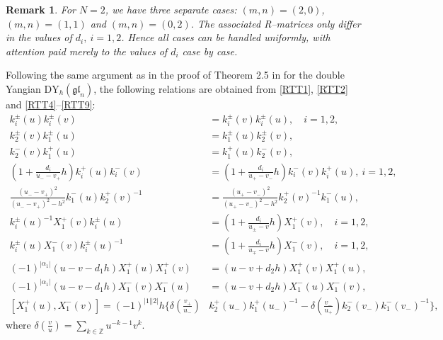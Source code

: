 \documentclass[a4paper,12pt]{article}
\newtheorem{rema}[theo]{Remark}
\numberwithin{equation}{section}
\begin{document}
\begin{rema}\label{m,n}
For $N=2$, we have three separate cases: $(m,n)=(2,0)$, $(m,n)=(1,1)$ and $(m,n)=(0,2)$. The associated R--matrices only differ in the values of $d_{i},~i=1,2$. Hence all cases can be handled uniformly, with attention paid merely to the values of $d_{i}$ case by case.
\end{rema}
Following the same argument as in the proof of Theorem 2.5 in \cite{YJ24} for the double Yangian $\mathrm{DY}_{h}(\mathfrak{gl}_{n})$, the following relations are obtained from \eqref{RTT1}, \eqref{RTT2} and \eqref{RTT4}--\eqref{RTT9}:
\begin{align}
k_{i}^{\pm}(u)k_{i}^{\pm}(v)&=k_{i}^{\pm}(v)k_{i}^{\pm}(u),\quad i=1,2,\\
k_{2}^{\pm}(v)k_{1}^{\pm}(u)&=k_{1}^{\pm}(u)k_{2}^{\pm}(v),\\
k_{2}^{-}(v)k_{1}^{+}(u)&=k_{1}^{+}(u)k_{2}^{-}(v),\\
\left(1+\frac{d_{i}}{u_{-}-v_{+}}h\right)k_{i}^{+}(u)k_{i}^{-}(v)&=
\left(1+\frac{d_{i}}{u_{+}-v_{-}}h\right)k_{i}^{-}(v)k_{i}^{+}(u),~i=1,2,\\
\frac{(u_{-}-v_{+})^{2}}{(u_{-}-v_{+})^{2}-h^{2}}k_{1}^{-}(u)k_{2}^{+}(v)^{-1}&=
\frac{(u_{+}-v_{-})^{2}}{(u_{+}-v_{-})^{2}-h^{2}}k_{2}^{+}(v)^{-1}k_{1}^{-}(u),\\
k_{i}^{\pm}(u)^{-1}X_{1}^{+}(v)k_{i}^{\pm}(u)&=\left(1+\frac{d_{i}}{u_{\pm}-v}h\right) X_{1}^{+}(v),\quad i=1,2,\\
k_{i}^{\pm}(u)X_{1}^{-}(v)k_{i}^{\pm}(u)^{-1}&=\left(1+\frac{d_{i}}{u_{\mp}-v}h
\right)X_{1}^{-}(v),\quad i=1,2,\\  \label{X1X1+}
(-1)^{|\alpha_{1}|}\left(u-v-d_{1}h\right)X_{1}^{+}(u)X_{1}^{+}(v)&=
\left(u-v+d_{2}h\right)X_{1}^{+}(v)X_{1}^{+}(u),\\ \label{X1X1-}
(-1)^{|\alpha_{1}|}\left(u-v-d_{1}h\right)X_{1}^{-}(v)X_{1}^{-}(u)&=
\left(u-v+d_{2}h\right)X_{1}^{-}(u)X_{1}^{-}(v),\\
\left[X_{1}^{+}(u),X_{1}^{-}(v)\right]=(-1)^{|1||2|}h\{\delta(\frac{v_{+}}{u_{-}})&k_{2}^{+}(u_{-})k_{1}^{+}(u_{-})^{-1}-\delta(\frac{v_{-}}{u_{+}})k_{2}^{-}(v_{-})k_{1}^{-}(v_{-})^{-1}\},
\end{align}
where $\delta(\frac{v}{u})=\sum_{k\in \mathbb{Z}}u^{-k-1}v^{k}$.
\end{document}
